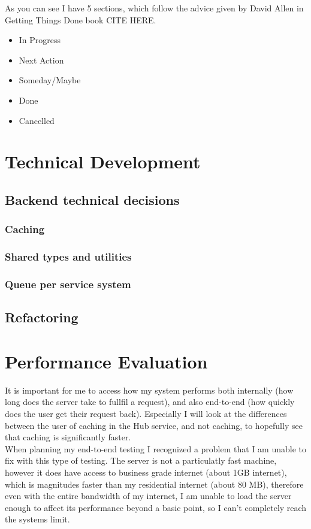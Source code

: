 \documentclass[titlepage]{article}
\begin{document}
As you can see I have 5 sections, which follow the advice given by David Allen in Getting Things Done book CITE HERE.

\begin{itemize}
  \item In Progress
  \item Next Action
  \item Someday/Maybe
  \item Done
  \item Cancelled
\end{itemize}

\pagebreak
\section{Technical Development}
\subsection{Backend technical decisions}
\subsubsection{Caching}
\subsubsection{Shared types and utilities}
\subsubsection{Queue per service system}
\subsection{Refactoring}

\section{Performance Evaluation}
It is important for me to access how my system performs both internally (how long does the server take to fullfil a request), and also end-to-end (how quickly does the user get their request back). Especially I will look at the differences between the user of caching in the Hub service, and not caching, to hopefully see that caching is significantly faster. \\

When planning my end-to-end testing I recognized a problem that I am unable to fix with this type of testing. The server is not a particulatly fast machine, however it does have access to business grade internet (about 1GB internet), which is magnitudes faster than my residential internet (about 80 MB), therefore even with the entire bandwidth of my internet, I am unable to load the server enough to affect its performance beyond a basic point, so I can't completely reach the systems limit.
\end{document}
